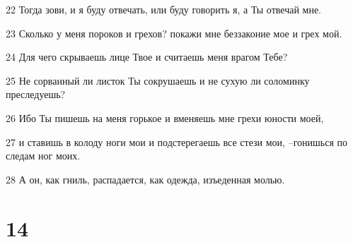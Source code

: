 \par 22 Тогда зови, и я буду отвечать, или буду говорить я, а Ты отвечай мне.
\par 23 Сколько у меня пороков и грехов? покажи мне беззаконие мое и грех мой.
\par 24 Для чего скрываешь лице Твое и считаешь меня врагом Тебе?
\par 25 Не сорванный ли листок Ты сокрушаешь и не сухую ли соломинку преследуешь?
\par 26 Ибо Ты пишешь на меня горькое и вменяешь мне грехи юности моей,
\par 27 и ставишь в колоду ноги мои и подстерегаешь все стези мои, --гонишься по следам ног моих.
\par 28 А он, как гниль, распадается, как одежда, изъеденная молью.

\chapter{14}

